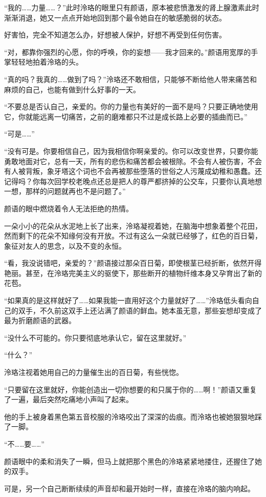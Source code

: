 \documentclass[UTF8, scheme = chinese, openany]{ctexbook}
\begin{document}
“我的……力量……？”此时泠珞的眼里只有颜语，原本被悲愤激发的肾上腺激素此时渐渐消退，她又一点点开始地回到那个最令她自在的敏感脆弱的状态。

好害怕，完全不知道怎么办，好想被人保护，好想不再受到任何伤害。

“对，都靠你强烈的心愿，你的呼唤，你的妄想——我才回来的。”颜语用宽厚的手掌轻轻地拍着泠珞的头。

“真的吗？我真的……做到了吗？”泠珞还不敢相信，只能够不断给他人带来痛苦和麻烦的自己，也能有做到什么好事的一天。

“不要总是否认自己，亲爱的。你的力量也有美好的一面不是吗？只要正确地使用它，你就能远离一切痛苦，之前的磨难都只不过是成长路上必要的插曲而已。”

“可是……”

“没有可是。你要相信自己，因为我相信你啊亲爱的。你可以改变世界，只要你能勇敢地面对它，总有一天，所有的悲伤和痛苦都会被根除。不会有人被伤害，不会有人被背叛，象牙塔这个词也不会再被那些堕落的世俗之人污蔑成幼稚和愚蠢。还记得吗？你每次回学校老晚点还总是把人的尊严都挤掉的公交车，只要你认真地想一想，那样的问题就再也不是问题了。”

颜语的眼中燃烧着令人无法拒绝的热情。

一朵小小的花朵从水泥地上长了出来，泠珞凝视着她，在脑海中想象着整个花田，然而剩下的花朵不知缘何没有开放。不过有这么一朵就已经够了，红色的百日菊，象征对友人的思念，以及不变的永恒。

“看，我没说错吧，亲爱的？”颜语接过那朵百日菊，即使根茎已经折断，依然开得艳丽。甚至，在泠珞完美主义的驱使下，那些断开的植物纤维本身又孕育出了新的花苞。

“如果真的是这样就好了……如果我能一直用好这个力量就好了……”泠珞低头看向自己的双手，不久前这双手上还沾满了颜语的鲜血。她本虽无意，那些妄想却变成了最为折磨颜语的武器。

“没什么不可能的。你只要彻底地承认它，留在这里就好。”

“什么？”

泠珞注视着她用自己的力量催生出的百日菊，有些恍惚。

“只要留在这里就好，你能创造出一切你想要的和只属于你的……啊！”颜语又重复了一遍，最后突然吃痛地小声叫了起来。

他的手上被身着黑色第五音校服的泠珞咬出了深深的齿痕。而泠珞也被她狠狠地踩了一脚。

“不……要……”

颜语眼中的柔和消失了一瞬，但马上就把那个黑色的泠珞紧紧地搂住，还握住了她的双手。

可是，另一个自己断断续续的声音却和最开始时一样，直接在泠珞的脑内响起。
\end{document}
